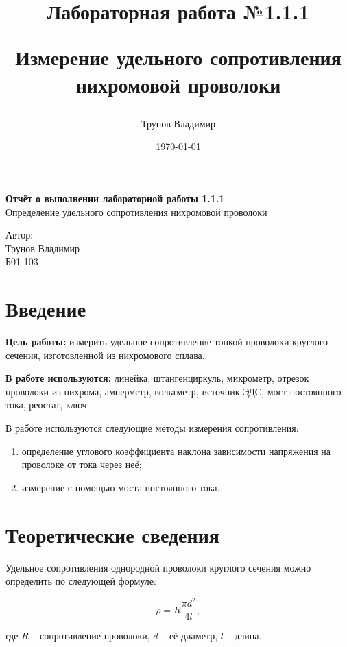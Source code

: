 \documentclass[a4paper,12pt]{article} %
\author{Трунов Владимир}
\title{Лабораторная работа №1.1.1

Измерение удельного сопротивления нихромовой проволоки
}
\date{\today}
\begin{document}
\begin{titlepage}
	\vspace*{4.5cm}
	{\huge
		\begin{center}
			{\bf Отчёт о выполнении лабораторной работы 1.1.1}\\
			Определение удельного сопротивления нихромовой проволоки
		\end{center}
	}
	\vspace{8cm}
	\begin{flushright}
		{\LARGE Автор:\\ Трунов Владимир \\
			\vspace{0.2cm}
			Б01-103}
	\end{flushright}
	\vspace{8cm}
\end{titlepage}

\section{Введение}

\textbf{Цель работы:} измерить удельное сопротивление тонкой проволоки круглого сечения, изготовленной из нихромового сплава.
\medskip

\textbf{В работе используются:} линейка, штангенциркуль, микрометр, отрезок проволоки из нихрома, амперметр, вольтметр, источник ЭДС, мост постоянного тока, реостат, ключ.
\medskip

В работе используются следующие методы измерения сопротивления:
\begin{enumerate}
	\item определение углового коэффициента наклона зависимости напряжения на проволоке от тока через неё;
	\item измерение с помощью моста постоянного тока.
\end{enumerate}

\section{Теоретические сведения}

Удельное сопротивления однородной проволоки круглого сечения можно определить по следующей формуле:

\begin{equation}\label{1form}
\rho = R \frac{\pi d^2}{4l},
\end{equation}

\noindent где $R$ -- сопротивление проволоки, $d$ -- её диаметр, $l$ -- длина.
\end{document}
